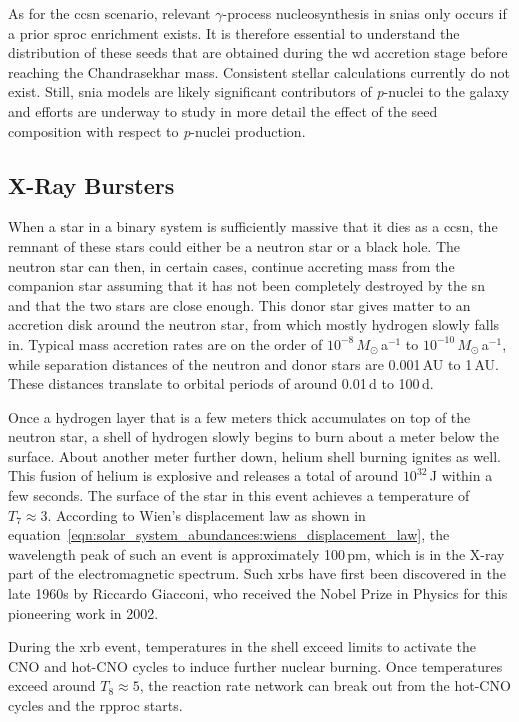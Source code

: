 As for the \ac{ccsn} scenario, relevant $\gamma$-process nucleosynthesis in \acp{snia} only occurs if a prior \ac{sproc} enrichment exists. It is therefore essential to understand the distribution of these seeds that are obtained during the \ac{wd} accretion stage before reaching the Chandrasekhar mass. Consistent stellar calculations currently do not exist. Still, \ac{snia} models are likely significant contributors of \textit{p}-nuclei to the galaxy and efforts are underway to study in more detail the effect of the seed composition with respect to \textit{p}-nuclei production.

\subsection{X-Ray Bursters}

When a star in a binary system is sufficiently massive that it dies as a \ac{ccsn}, the remnant of these stars could either be a neutron star or a black hole. The neutron star can then, in certain cases, continue accreting mass from the companion star assuming that it has not been completely destroyed by the \ac{sn} and that the two stars are close enough. This donor star gives matter to an accretion disk around the neutron star, from which mostly hydrogen slowly falls in. Typical mass accretion rates are on the order of $10^{-8}\,M_\odot\,$a$^{-1}$ to $10^{-10}\,M_\odot\,$a$^{-1}$, while separation distances of the neutron and donor stars are 0.001\,AU to 1\,AU. These distances translate to orbital periods of around 0.01\,d to 100\,d. 

Once a hydrogen layer that is a few meters thick accumulates on top of the neutron star, a shell of hydrogen slowly begins to burn about a meter below the surface. About another meter further down, helium shell burning ignites as well. This fusion of helium is explosive and releases a total of around $10^{32}\,$J within a few seconds. The surface of the star in this event achieves a temperature of $T_7\approx 3$. According to Wien's displacement law as shown in equation~\eqref{eqn:solar_system_abundances:wiens_displacement_law}, the wavelength peak of such an event is approximately 100\,pm, which is in the X-ray part of the electromagnetic spectrum. Such \acp{xrb} have first been discovered in the late 1960s by Riccardo Giacconi, who received the Nobel Prize in Physics for this pioneering work in 2002.

During the \ac{xrb} event, temperatures in the shell exceed limits to activate the CNO and hot-CNO cycles to induce further nuclear burning. Once temperatures exceed around $T_8 \approx 5$, the reaction rate network can break out from the hot-CNO cycles and the \ac{rpproc} starts.

